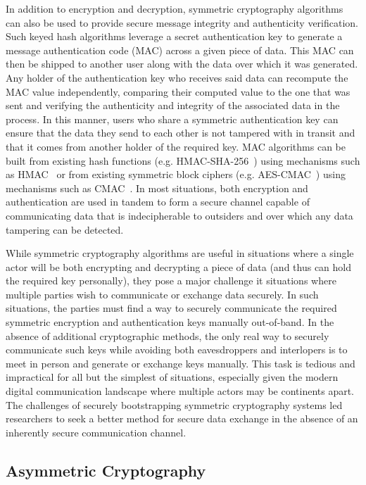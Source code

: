 In addition to encryption and decryption, symmetric cryptography
algorithms can also be used to provide secure message integrity and
authenticity verification. Such keyed hash algorithms leverage a
secret authentication key to generate a message authentication code
(MAC) across a given piece of data. This MAC can then be shipped to
another user along with the data over which it was generated. Any
holder of the authentication key who receives said data can recompute
the MAC value independently, comparing their computed value to the one
that was sent and verifying the authenticity and integrity of the
associated data in the process. In this manner, users who share a
symmetric authentication key can ensure that the data they send to
each other is not tampered with in transit and that it comes from
another holder of the required key. MAC algorithms can be built from
existing hash functions (e.g. HMAC-SHA-256~\cite{kelly2007}) using
mechanisms such as HMAC~\cite{krawczyk1997} or from existing symmetric
block ciphers (e.g. AES-CMAC~\cite{song2006}) using mechanisms such as
CMAC~\cite{Black2005, dworkin2005}. In most situations, both
encryption and authentication are used in tandem to form a secure
channel capable of communicating data that is indecipherable to
outsiders and over which any data tampering can be detected.

While symmetric cryptography algorithms are useful in situations where
a single actor will be both encrypting and decrypting a piece of data
(and thus can hold the required key personally), they pose a major
challenge it situations where multiple parties wish to communicate or
exchange data securely. In such situations, the parties must find a
way to securely communicate the required symmetric encryption and
authentication keys manually out-of-band. In the absence of additional
cryptographic methods, the only real way to securely communicate such
keys while avoiding both eavesdroppers and interlopers is to meet in
person and generate or exchange keys manually. This task is tedious
and impractical for all but the simplest of situations, especially
given the modern digital communication landscape where multiple actors
may be continents apart. The challenges of securely bootstrapping
symmetric cryptography systems led researchers to seek a better method
for secure data exchange in the absence of an inherently secure
communication channel.

\subsection{Asymmetric Cryptography}

